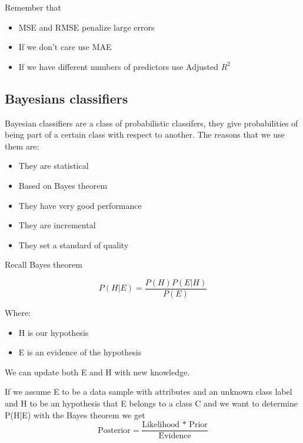 \vspace{10pt}

Remember that

\begin{itemize}
    \item MSE and RMSE penalize large errors
    \item If we don't care use MAE
    \item If we have different numbers of predictors use Adjusted $R^2$
\end{itemize}



\subsection{Bayesians classifiers}

Bayesian classifiers are a class of probabilistic classifers, they give probabilities of
being part of a certain class with respect to another.
The reasons that we use them are:
\begin{itemize}
    \item They are statistical
    \item Based on Bayes theorem
    \item They have very good performance
    \item They are incremental
    \item They set a standard of quality
\end{itemize}

\vspace{10pt}

Recall Bayes theorem

\begin{equation}
    P(H|E) =  \frac{P(H)P(E|H)}{P(E)}
\end{equation}

Where:

\begin{itemize}
    \item H is our hypothesis
    \item E is an evidence of the hypothesis
\end{itemize}

We can update both E and H with new knowledge.

\vspace{10pt}

If we assume E to be a data sample with attributes and an unknown class label and H
to be an hypothesis that E belongs to a class C and we want to determine P(H|E) with 
the Bayes theorem we get
\begin{equation}
    \text{Posterior} = \frac{\text{Likelihood * Prior}}{\text{Evidence}}
\end{equation}

